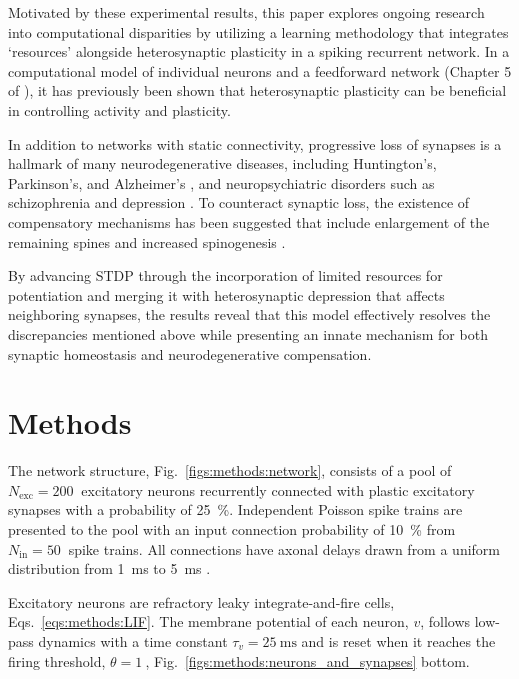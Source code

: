 \documentclass[utf8]{FrontiersinHarvard} %
\begin{document}
Motivated by these experimental results, this paper explores ongoing research into computational disparities by utilizing a learning methodology that integrates `resources' alongside heterosynaptic plasticity in a spiking recurrent network. In a computational model of individual neurons \citep{Chen.201381r} and a feedforward network (Chapter 5 of \citep{Humble.2013}), it has previously been shown that heterosynaptic plasticity can be beneficial in controlling activity and plasticity.

In addition to networks with static connectivity, progressive loss of synapses is a hallmark of many neurodegenerative diseases, including Huntington's, Parkinson's, and Alzheimer's \citep{Herms.2015,Meftah.2023}, and neuropsychiatric disorders such as schizophrenia and depression \citep{Penzes.2011}. To counteract synaptic loss, the existence of compensatory mechanisms has been suggested that include enlargement of the remaining spines and increased spinogenesis \citep{Bhembre.2023}.

By advancing STDP through the incorporation of limited resources for potentiation and merging it with heterosynaptic depression that affects neighboring synapses, the results reveal that this model effectively resolves the discrepancies mentioned above while presenting an innate mechanism for both synaptic homeostasis and neurodegenerative compensation.

\section{Methods}
The network structure, Fig.~\ref{figs:methods:network}, consists of a pool of $N_{\mathrm{exc}}=\SI{200}{}$ excitatory neurons recurrently connected with plastic excitatory synapses with a probability of \SI{25}{\percent}. Independent Poisson spike trains are presented to the pool with an input connection probability of \SI{10}{\percent} from $N_{\mathrm{in}}=\SI{50}{}$ spike trains. All connections have axonal delays drawn from a uniform distribution from \SI{1}{\milli\second} to \SI{5}{\milli\second} \citep{Lemarechal.2021yt1}.

Excitatory neurons are refractory leaky integrate-and-fire cells, Eqs.~\ref{eqs:methods:LIF}. The membrane potential of each neuron, $v$, follows low-pass dynamics with a time constant $\tau_{v}=\SI{25}{\milli\second}$ \citep{Rall.1969w7} and is reset when it reaches the firing threshold, $\theta=\SI{1}{}$, Fig.~\ref{figs:methods:neurons_and_synapses} bottom.
\end{document}
